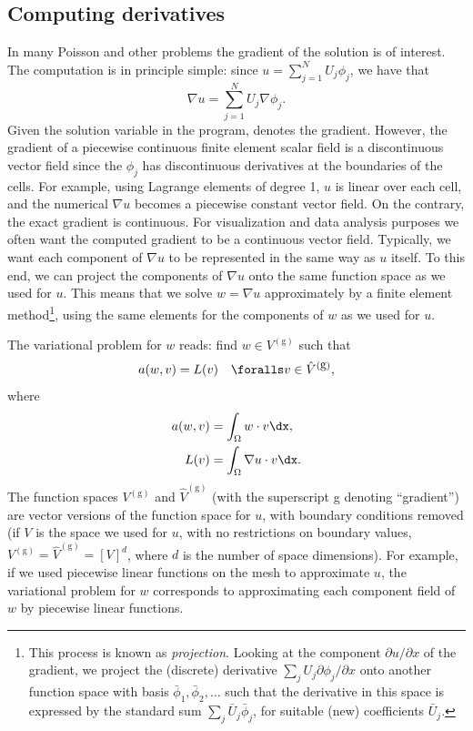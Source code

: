 \subsection{Computing derivatives}
\label{langtangen:poisson:gradu}

In many Poisson and other problems the gradient of the solution is of
interest. The computation is in principle simple: since $u = \sum_{j=1}^N
U_j \phi_j$, we have that
\begin{equation}
  \nabla u = \sum_{j=1}^N U_j \nabla \phi_j.
\end{equation}
Given the solution variable  in the program,  denotes
the gradient. However, the gradient of a piecewise continuous finite
element scalar field is a discontinuous vector field since the $\phi_j$
has discontinuous derivatives at the boundaries of the cells. For example,
using Lagrange elements of degree 1, $u$ is linear over each cell, and
the numerical $\nabla u$ becomes a piecewise constant vector field. On
the contrary, the exact gradient is continuous.  For visualization
and data analysis purposes we often want the computed gradient to be a
continuous vector field. Typically, we want each component of $\nabla
u$ to be represented in the same way as $u$ itself. To this end,
we can project the components of $\nabla u$ onto the same function
space as we used for $u$.  This means that we solve $w = \nabla u$
approximately by a finite element method\footnote{This process is known as
\emph{projection}.  Looking at the component $\partial
u/\partial x$ of the gradient, we project the (discrete) derivative
$\sum_jU_j{\partial \phi_j/\partial x}$ onto another function space
with basis $\bar\phi_1,\bar\phi_2,\ldots$ such that the derivative in
this space is expressed by the standard sum $\sum_j\bar U_j\bar \phi_j$,
for suitable (new) coefficients $\bar U_j$.}, using the same elements
for the components of $w$ as we used for $u$.

The variational problem for $w$ reads: find $w\in V^{(\mbox{g})}$ such that
\begin{equation}
  a(w, v) = L(v)\quad\foralls v\in \hat{V}^{(\mbox{g})},
\end{equation}
where
\begin{align}
  a(w, v) &= \int_\Omega w\cdot v\dx,
\\
  L(v) &= \int_\Omega \nabla u\cdot v\dx.
\end{align}
The function spaces $V^{(\mbox{g})}$ and $\hat{V}^{(\mbox{g})}$ (with
the superscript g denoting ``gradient'') are vector versions of the
function space for $u$, with boundary conditions removed (if $V$ is
the space we used for $u$, with no restrictions on boundary values, $
V^{(\mbox{g})} = \hat{V}^{(\mbox{g})} = [V]^d$, where $d$ is the
number of space dimensions).  For example, if we used piecewise linear
functions on the mesh to approximate $u$, the variational problem for
$w$ corresponds to approximating each component field of $w$ by
piecewise linear functions.

